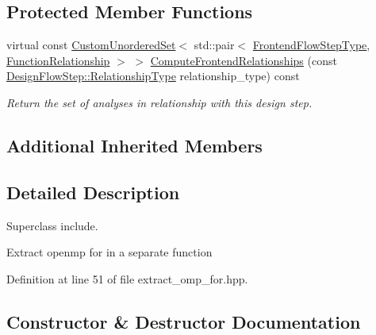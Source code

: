\subsection*{Protected Member Functions}
\begin{DoxyCompactItemize}
\item 
virtual const \hyperlink{classCustomUnorderedSet}{Custom\+Unordered\+Set}$<$ std\+::pair$<$ \hyperlink{frontend__flow__step_8hpp_afeb3716c693d2b2e4ed3e6d04c3b63bb}{Frontend\+Flow\+Step\+Type}, \hyperlink{classFrontendFlowStep_af7cf30f2023e5b99e637dc2058289ab0}{Function\+Relationship} $>$ $>$ \hyperlink{classExtractOmpFor_a915e472b3f29a1dd3aab7b9ef2cb8e83}{Compute\+Frontend\+Relationships} (const \hyperlink{classDesignFlowStep_a723a3baf19ff2ceb77bc13e099d0b1b7}{Design\+Flow\+Step\+::\+Relationship\+Type} relationship\+\_\+type) const
\begin{DoxyCompactList}\small\item\em Return the set of analyses in relationship with this design step. \end{DoxyCompactList}\end{DoxyCompactItemize}
\subsection*{Additional Inherited Members}


\subsection{Detailed Description}
Superclass include. 

Extract openmp for in a separate function 

Definition at line 51 of file extract\+\_\+omp\+\_\+for.\+hpp.



\subsection{Constructor \& Destructor Documentation}
\mbox{\label{classExtractOmpFor_a3d6aea92a79e5a2cc03a3b6007b0f383}} 
